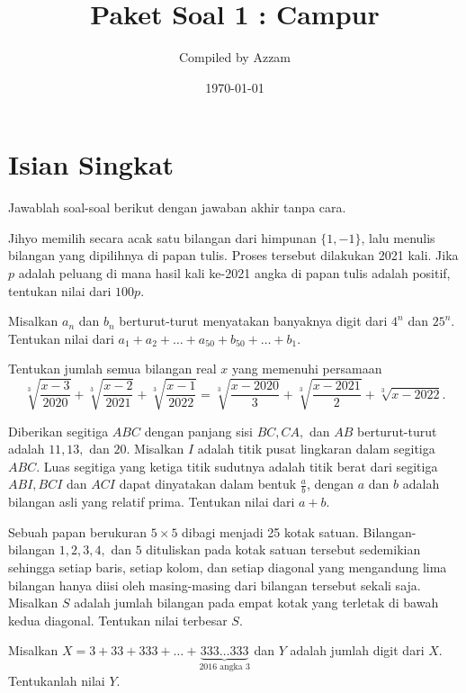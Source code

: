 \documentclass[11pt]{scrartcl}
\begin{document}
	\title{Paket Soal 1 : Campur} %
	\date{\today}
	\author{Compiled by Azzam}
	\maketitle
	\newpage
	
	\section{Isian Singkat}
	Jawablah soal-soal berikut dengan jawaban akhir tanpa cara.
	
	\begin{soalbaru}
		Jihyo memilih secara acak satu bilangan dari himpunan $\{1,-1\}$, lalu menulis bilangan yang dipilihnya di papan tulis. Proses tersebut dilakukan 2021 kali. Jika $p$ adalah peluang di mana hasil kali ke-2021 angka di papan tulis adalah positif, tentukan nilai dari $100p$.
		
		
	\end{soalbaru}
	
	
	\begin{soalbaru}
		Misalkan $a_n$ dan $b_n$ berturut-turut menyatakan banyaknya digit dari $4^n$ dan $25^n$. Tentukan nilai dari $a_1+a_2+\dots +a_{50}+b_{50}+\dots+b_1$.
		
	\end{soalbaru}
	
	\begin{soalbaru}
		Tentukan jumlah semua bilangan real $x$ yang memenuhi persamaan $$\sqrt[3]{\frac{x-3}{2020}}+\sqrt[3]{\frac{x-2}{2021}}+\sqrt[3]{\frac{x-1}{2022}}=\sqrt[3]{\frac{x-2020}{3}}+\sqrt[3]{\frac{x-2021}{2}}+\sqrt[3]{x-2022}.$$
	\end{soalbaru}
	
	\begin{soalbaru}
		Diberikan segitiga $ABC$ dengan panjang sisi $BC,CA,$ dan $AB$ berturut-turut adalah $11,13,$ dan $20$. Misalkan $I$ adalah titik pusat lingkaran dalam segitiga $ABC$. Luas segitiga yang ketiga titik sudutnya adalah titik berat dari segitiga $ABI,BCI$ dan $ACI$ dapat dinyatakan dalam bentuk $\frac{a}{b}$, dengan $a$ dan $b$ adalah bilangan asli yang relatif prima. Tentukan nilai dari $a+b$.
	\end{soalbaru}
	
	\begin{soalbaru}
		Sebuah papan berukuran $5 \times 5$ dibagi menjadi 25 kotak satuan. Bilangan-bilangan $1,2,3,4,$ dan $5$ dituliskan pada kotak satuan tersebut sedemikian sehingga setiap baris, setiap kolom, dan setiap diagonal yang mengandung lima bilangan hanya diisi oleh masing-masing dari bilangan tersebut sekali saja. Misalkan $S$ adalah jumlah bilangan pada empat kotak yang terletak di bawah kedua diagonal. Tentukan nilai terbesar $S$.
	\end{soalbaru}
	\begin{soalbaru}
		Misalkan $X = 3 + 33 + 333 + \dots + \underbrace{333 \dots 333}_{2016 \text{ angka } 3}$ dan $Y$ adalah jumlah digit dari $X$. Tentukanlah nilai $Y$.
	\end{soalbaru}
	
\end{document}
